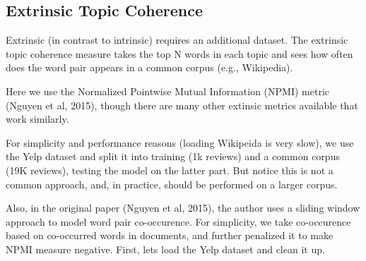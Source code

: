 \documentclass[]{article}
\begin{document}
\hypertarget{extrinsic-topic-coherence}{%
\subsection{Extrinsic Topic Coherence}\label{extrinsic-topic-coherence}}

Extrinsic (in contrast to intrinsic) requires an additional dataset. The
extrinsic topic coherence measure takes the top N words in each topic
and sees how often does the word pair appears in a common corpus (e.g.,
Wikipedia).

Here we use the Normalized Pointwise Mutual Information (NPMI) metric
(Nguyen et al, 2015), though there are many other extinsic metrics
available that work similarly.

For simplicity and performance reasons (loading Wikipeida is very slow),
we use the Yelp dataset and split it into training (1k reviews) and a
common corpus (19K reviews), testing the model on the latter part. But
notice this is not a common approach, and, in practice, should be
performed on a larger corpus.

Also, in the original paper (Nguyen et al, 2015), the author uses a
sliding window approach to model word pair co-occurence. For simplicity,
we take co-occurence based on co-occurred words in documents, and
further penalized it to make NPMI measure negative. First, lets load the
Yelp dataset and clean it up.
\end{document}
